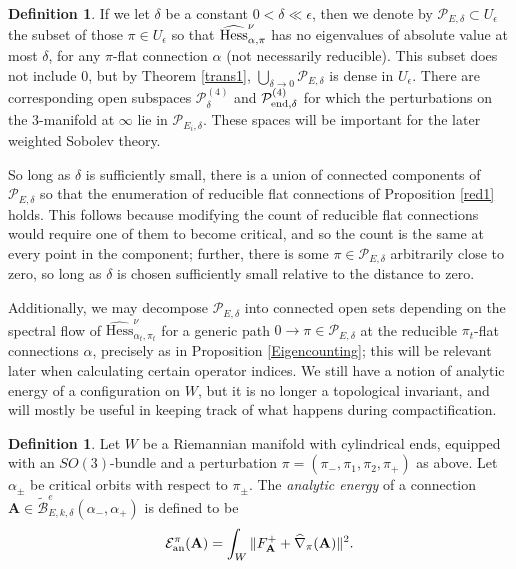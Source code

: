 \documentclass[10pt,a4paper]{amsart}
\theoremstyle{definition}
\newtheorem{definition}[theorem]{Definition}
\theoremstyle{remark}
\numberwithin{figure}{qchap}
\begin{document}
\begin{definition}
If we let $\delta$ be a constant $0 < \delta \ll \epsilon$, then we denote by $\mathcal P_{E,\delta} \subset U_\epsilon$ the subset of those $\pi \in U_\epsilon$ so that $\widehat{\textup{Hess}}^\nu_{\alpha,\pi}$ has no eigenvalues of absolute value at most $\delta$, for any $\pi$-flat connection $\alpha$ (not necessarily reducible). This subset does not include $0$, but by Theorem \ref{trans1}, $\bigcup_{\delta \to 0} \mathcal P_{E, \delta}$ is dense in $U_\epsilon$. There are corresponding open subspaces $\mathcal P^{(4)}_\delta$ and $\mathcal P^{(4)}_{\textup{end}, \delta}$ for which the perturbations on the 3-manifold at $\infty$ lie in $\mathcal P_{E_i, \delta}$. These spaces will be important for the later weighted Sobolev theory. 
\end{definition}

So long as $\delta$ is sufficiently small, there is a union of connected components of $\mathcal P_{E,\delta}$ so that the enumeration of reducible flat connections of Proposition \ref{red1} holds. This follows because modifying the count of reducible flat connections would require one of them to become critical, and so the count is the same at every point in the component; further, there is some $\pi \in \mathcal P_{E,\delta}$ arbitrarily close to zero, so long as $\delta$ is chosen sufficiently small relative to the distance to zero. 

Additionally, we may decompose $\mathcal P_{E, \delta}$ into connected open sets depending on the spectral flow of $\widehat{\text{Hess}}^\nu_{\alpha_t, \pi_t}$ for a generic path $0 \to \pi \in \mathcal P_{E, \delta}$ at the reducible $\pi_t$-flat connections $\alpha$, precisely as in Proposition \ref{Eigencounting}; this will be relevant later when calculating certain operator indices.
We still have a notion of analytic energy of a configuration on $W$, but it is no longer a topological invariant, and will mostly be useful in keeping track of what happens during compactification.

\begin{definition}Let $W$ be a Riemannian manifold with cylindrical ends, equipped with an $SO(3)$-bundle and a perturbation $\pi = (\pi_-, \pi_1, \pi_2, \pi_+)$ as above. Let $\alpha_\pm$ be critical orbits with respect to $\pi_\pm$. The \emph{analytic energy} of a connection $\mathbf{A} \in \widetilde{\mathcal B}^{e}_{E,k,\delta}(\alpha_-,\alpha_+)$ is defined to be $$\mathcal E^\pi_{\textup{an}}(\mathbf{A}) = \int_W \|F^+_{\mathbf{A}} + \widehat{\nabla}_\pi(\mathbf{A})\|^2.$$
\end{definition}
\end{document}
